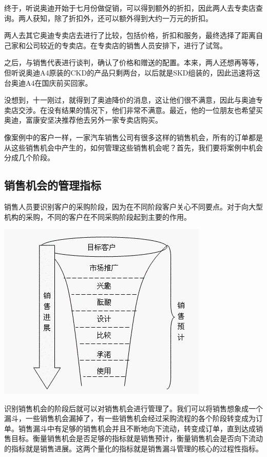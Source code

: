     终于，听说奥迪开始于七月份做促销，可以得到额外的折扣，因此两人去专卖店查询。两人获知，除了折扣外，还可以额外得到大约一万元的折扣。

    两人去其它奥迪专卖店去进行了比较，包括价格，折扣和服务，最终选择了距离自己家和公司较近的专卖店。在专卖店的销售人员安排下，进行了试驾。

    之后，与销售代表进行谈判，确认了价格和赠送的配置。本来，两人还想再等等，但听说奥迪A4原装的CKD的产品只剩两台，以后就是SKD组装的，因此迅速将这台奥迪A4在国庆前买回家。

    没想到，十一刚过，就得到了奥迪降价的消息，这让他们很不满意，因此与奥迪专卖店交涉。在没有结果的情况下，他们非常不满意。最近，他的一位朋友也希望买奥迪，富康安坚决推荐他去另外一家专卖店购买。

    像案例中的客户一样，一家汽车销售公司有很多这样的销售机会，所有的订单都是从这些销售机会中产生的，如何管理这些销售机会呢？首先，我们要将案例中机会分成几个阶段。

\subsection {销售机会的管理指标}

    销售人员要识别客户的采购阶段，因为在不同阶段客户关心不同要点。对于向大型机构的采购，不同的客户在不同采购阶段起到主要的作用。

    \begin{center}
        \includegraphics[scale=.6] {loudou1.png}
    \end{center}

    识别销售机会的阶段后就可以对销售机会进行管理了。我们可以将销售想象成一个漏斗，一些销售机会漏掉了，有一些销售机会经过采购流程的各个阶段转变成为订单。销售漏斗中有足够的销售机会并且不断地向下流动，转变成订单，直到达成销售目标。衡量销售机会是否足够的指标就是销售预计，衡量销售机会是否向下流动的指标就是销售进展。这两个量化的指标就是销售漏斗管理的核心的过程性指标。

